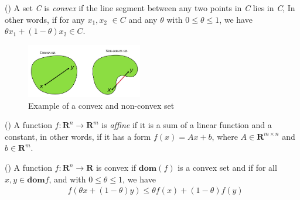 \begin{definition}
(\cite[23]{boyd2004convex})
A set \textit{C} is \textit{convex} if the line segment between any two points in \textit{C} lies in \textit{C}, In other words, if for any $x_{1}, x_{2}$ $\in C$ and any $\theta$ with $0 \leq \theta \leq 1$, we have $\theta x_{1} + (1-\theta) x_{2} \in C.$
\end{definition}
\vspace*{0pt}
\begin{figure}[h!]
    \centering
        \includegraphics[width=0.45\textwidth]{Pictures/Convex ex.png}
    \caption{Example of a convex and non-convex set}
    \label{fig:conv-nonconv}
\end{figure}

\begin{definition}
(\cite[36]{boyd2004convex})
A function $f: \mathbf{R}^{n} \longrightarrow \mathbf{R}^m$ is \textit{affine} if it is a sum of a linear function and a constant, in other words, if it has a form $f(x) = Ax + b$, where $A \in \mathbf{R}^{m \times n}$ and $b \in \mathbf{R}^m$.
\end{definition}

\begin{definition}\label{definition.2.4}
(\cite[67]{boyd2004convex})
A function $f: \mathbf{R}^{n} \longrightarrow \mathbf{R}$ is convex if $\textbf{dom}(f)$ is a convex set and if for all $x,y \in \textbf{dom} \textit{f}$, and with $0 \leq \theta \leq 1$, we have 
\begin{equation*}\label{eq:4}\tag{2.1.1}
\begin{aligned}
    &f(\theta x + (1-\theta) y) \leq \theta f(x) + (1-\theta) f(y)
\end{aligned}
\end{equation*}
\end{definition}

